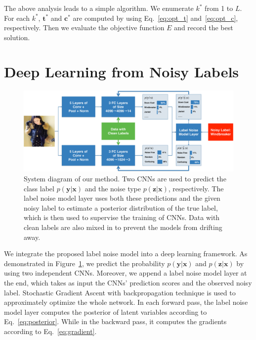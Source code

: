 \documentclass[10pt,twocolumn,letterpaper]{article}
\def\vec{\mathbf}
\begin{document}
The above analysis leads to a simple algorithm. We enumerate $k^*$ from 1 to $L$. For each $k^*$, $\vec{t}^*$ and $\vec{c}^*$ are computed by using Eq.~\eqref{eq:opt_t} and~\eqref{eq:opt_c}, respectively. Then we evaluate the objective function $E$ and record the best solution.




\section{Deep Learning from Noisy Labels} %
\label{sec:deep_learning_from_noisy_labels}

\begin{figure}
\begin{center}
\includegraphics[width=0.85\linewidth]{figure/diagram.pdf}
\end{center}
\caption{System diagram of our method. Two CNNs are used to predict the class label $p(\vec{y}|\vec{x})$ and the noise type $p(\vec{z}|\vec{x})$, respectively. The label noise model layer uses both these predictions and the given noisy label to estimate a posterior distribution of the true label, which is then used to supervise the training of CNNs. Data with clean labels are also mixed in to prevent the models from drifting away.}
\label{fig:framework}
\end{figure}

We integrate the proposed label noise model into a deep learning framework. As demonstrated in Figure~\ref{fig:framework}, we predict the probability $p(\vec{y}|\vec{x})$ and $p(\vec{z}|\vec{x})$ by using two independent CNNs. Moreover, we append a label noise model layer at the end, which takes as input the CNNs' prediction scores and the observed noisy label. Stochastic Gradient Ascent with backpropagation technique is used to approximately optimize the whole network. In each forward pass, the label noise model layer computes the posterior of latent variables according to Eq.~\eqref{eq:posterior}. While in the backward pass, it computes the gradients according to Eq.~\eqref{eq:gradient}.
\end{document}
